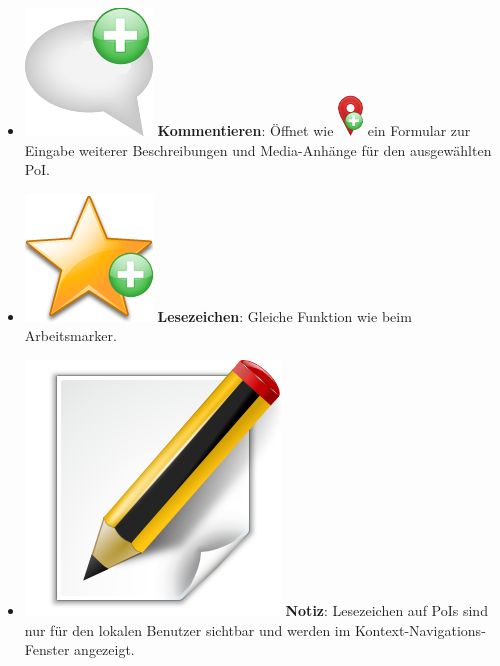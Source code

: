\begin{itemize}[leftmargin=*,noitemsep,topsep=1ex,parsep=0pt,partopsep=0pt]
\item \includegraphics[scale=0.15]{bilder/icons/add-comment.png} \textbf{Kommentieren}: Öffnet wie \includegraphics[scale=0.55]{bilder/icons/add-marker.png} ein Formular zur Eingabe weiterer Beschreibungen und Media-Anhänge für den ausgewählten PoI. 
\item \includegraphics[scale=0.15]{bilder/icons/add-bookmark.png} \textbf{Lesezeichen}: Gleiche Funktion wie beim Arbeitsmarker.  
\item \includegraphics[scale=0.07]{bilder/icons/edit-note.png} \textbf{Notiz}: Lesezeichen auf PoIs sind nur für den lokalen Benutzer sichtbar und werden im Kontext-Navigations-Fenster angezeigt.
\end{itemize}

